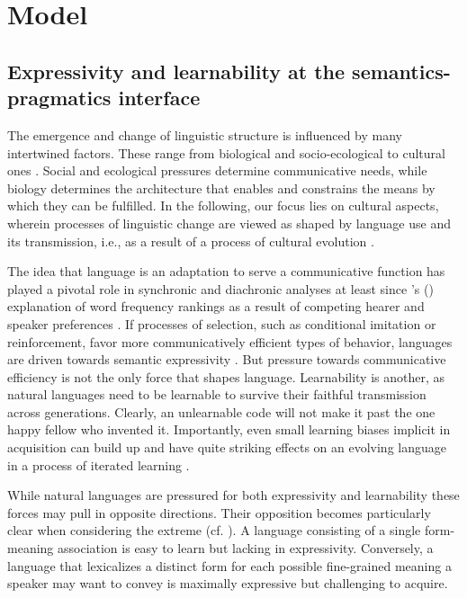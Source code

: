 \documentclass[a4paper]{article}
\newcommand{\citeposs}[2][]{\citeauthor{#2}'s (\citeyear[#1]{#2})}
\begin{document}
\section{Model}
\label{sec:model}

\subsection{Expressivity and learnability at the semantics-pragmatics interface}

The emergence and change of linguistic structure is influenced by many intertwined
factors. These range from biological and socio-ecological to cultural ones \citep{benz+etal:2005b,steels:2011,tamariz+kirby:2016}. Social and ecological pressures determine communicative needs, while
biology determines the architecture that enables and constrains the means by which they can be
fulfilled. In the following, our focus lies on cultural aspects, wherein processes of
linguistic change are viewed as shaped by language use and its transmission, i.e., as a result
of a process of cultural evolution
\citep{Pagel2009:Human-Language-,ThompsonKirby2016:Culture-Shapes-}.

The idea that language is an adaptation to serve a communicative function has played a pivotal
role in synchronic and diachronic analyses at least since \citeposs{zipf:1949} explanation of
word frequency rankings as a result of competing hearer and speaker preferences \citep[e.g., in][]{martinet:1962, horn:1984,jaeger+vRooij:2007,jaeger:2007,
  piantadosi:2014,kirby+etal:2015}. If processes of selection, such as conditional imitation
or reinforcement, favor more communicatively efficient types of behavior, languages are driven
towards semantic expressivity \citep[e.g.,][]{nowak+krakauer:1999,Skyrms2010:Signals}. But
pressure towards communicative efficiency is not the only force that shapes
language. Learnability is another, as natural languages need to be learnable to survive their
faithful transmission across generations. Clearly, an unlearnable code will not make it past
the one happy fellow who invented it. Importantly, even small learning biases implicit in acquisition
can build up and have quite striking effects on an evolving language in a process
of iterated learning
\citep{KirbyHurford2002:The-Emergence-o,SmithKirby2003:Iterated-Learni,kirby+etal:2014}. 

While natural languages are pressured for both expressivity and learnability these forces may pull in opposite directions. Their opposition becomes particularly clear when
considering the extreme (cf. \citealt{kemp+regier:2012,kirby+etal:2015}). A language consisting of a 
single form-meaning association is easy to learn but lacking in expressivity. Conversely, a
language that lexicalizes a distinct form for each possible fine-grained meaning a speaker may want to
convey is maximally expressive but challenging to acquire.
\end{document}
